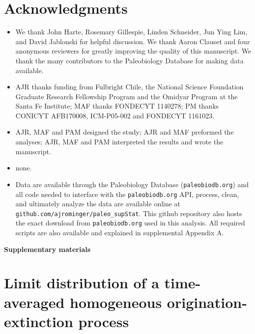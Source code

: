 \documentclass[12pt]{article}
\begin{document}
\section*{Acknowledgments}
\begin{itemize}
\item[{\bf General:}] We thank John Harte, Rosemary Gillespie, Linden
  Schneider, Jun Ying Lim, and David Jablonski for helpful
  discussion. We thank Aaron Clauset and four anonymous reviewers for
  greatly improving the quality of this manuscript. We thank the many
  contributors to the Paleobiology Database for making data available.
\item[{\bf Funding:}] AJR thanks funding from Fulbright Chile, the
  National Science Foundation Graduate Research Fellowship Program and
  the Omidyar Program at the Santa Fe Institute; MAF thanks FONDECYT
  1140278; PM thanks CONICYT AFB170008, ICM-P05-002 and FONDECYT
  1161023.
\item[{\bf Author contributions:}] AJR, MAF and PAM designed the
  study; AJR and MAF preformed the analyses; AJR, MAF and PAM
  interpreted the results and wrote the manuscript.
\item[{\bf Competing interests:}] none.
\item[{\bf Data and materials availability:}] Data are available
  through the Paleobiology Database ({\tt paleobiodb.org}) and all
  code needed to interface with the {\tt paleobiodb.org} API, process,
  clean, and ultimately analyze the data are available online at \\
  {\tt github.com/ajrominger/paleo\_supStat}. This github repository
  also hosts the exact download from {\tt paleobiodb.org} used in this
  analysis. All required scripts are also available and explained in
  supplemental Appendix A.
\end{itemize}


\clearpage

\newcommand{\beginsupplement}{%
  \setcounter{table}{0}
  \renewcommand{\thetable}{S\arabic{table}}%
  \setcounter{figure}{0}
  \renewcommand{\thefigure}{S\arabic{figure}}%
  \setcounter{section}{0}
  \renewcommand{\thesection}{S\arabic{section}}%
}

\beginsupplement

\begin{center}
{\LARGE \bf Supplementary materials}
\end{center}
\vspace{2em}

\section{Limit distribution of a time-averaged homogeneous
  origination-extinction process}
\label{sec:suppLimitDist}
\end{document}
